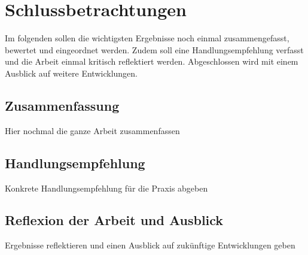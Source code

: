 \chapter{Schlussbetrachtungen}

Im folgenden sollen die wichtigsten Ergebnisse noch einmal zusammengefasst, bewertet und eingeordnet werden. Zudem soll eine Handlungsempfehlung verfasst und die Arbeit einmal kritisch reflektiert werden. Abgeschlossen wird mit einem Ausblick auf weitere Entwicklungen.

\section{Zusammenfassung}

Hier nochmal die ganze Arbeit zusammenfassen

\section{Handlungsempfehlung}

Konkrete Handlungsempfehlung für die Praxis abgeben

\section{Reflexion der Arbeit und Ausblick}

Ergebnisse reflektieren und einen Ausblick auf zukünftige Entwicklungen geben